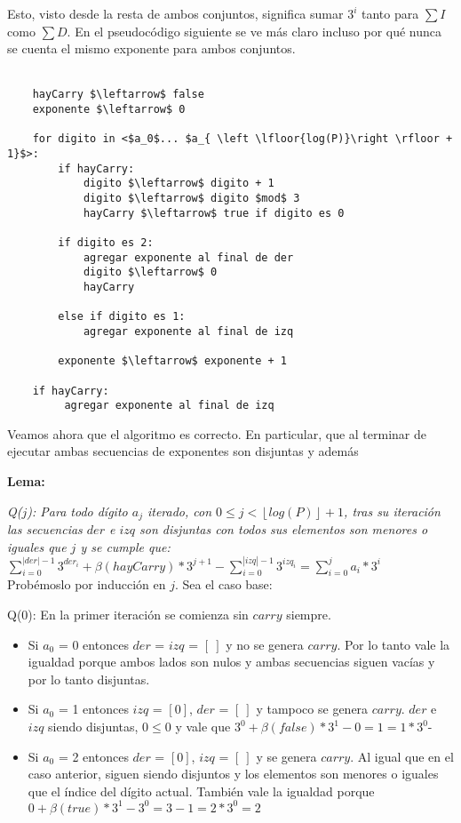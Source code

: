 	Esto, visto desde la resta de ambos conjuntos, significa sumar $3^{i}$ tanto para $\sum I$ como $\sum D$. En el pseudocódigo siguiente se ve más claro incluso por qué nunca se cuenta el mismo exponente para ambos conjuntos.
\\
\\
\begin{lstlisting}
    hayCarry $\leftarrow$ false
    exponente $\leftarrow$ 0

    for digito in <$a_0$... $a_{ \left \lfloor{log(P)}\right \rfloor + 1}$>:
        if hayCarry:
            digito $\leftarrow$ digito + 1
            digito $\leftarrow$ digito $mod$ 3
            hayCarry $\leftarrow$ true if digito es 0

        if digito es 2:
            agregar exponente al final de der
            digito $\leftarrow$ 0
            hayCarry

        else if digito es 1:
            agregar exponente al final de izq

        exponente $\leftarrow$ exponente + 1

    if hayCarry:
         agregar exponente al final de izq

\end{lstlisting}

	Veamos ahora que el algoritmo es correcto. En particular, que al terminar de ejecutar ambas secuencias de exponentes son disjuntas y además

	\begin{center}
		\textbf{Lema:}
	\end{center}

	\emph{
	Q($j$): Para todo dígito $a_j$ iterado, con $0 \leq j < \left \lfloor{log(P)}\right \rfloor + 1$, tras su iteración las secuencias $der$ e $izq$ son disjuntas con todos sus elementos son menores o iguales que $j$ y se cumple que:
	}
	\\

	$\sum_{i=0}^{|der|-1} 3^{der_i} + \beta(hayCarry)*3^{j+1} - \sum_{i=0}^{|izq|-1} 3^{izq_i} = \sum_{i=0}^{j} a_i*3^{i} $
	\\

	Probémoslo por inducción en $j$. Sea el caso base:

	Q($0$): En la primer iteración se comienza sin $carry$ siempre.

	\begin{itemize}
	\item Si $a_0$ = 0 entonces $der$ = $izq$ = $[\ ]$ y no se genera $carry$. Por lo tanto vale la igualdad porque ambos lados son nulos y ambas secuencias siguen vacías y por lo tanto disjuntas.
	\item Si $a_0$ = 1 entonces $izq$ = $[0]$, $der$ = $[\ ]$ y tampoco se genera $carry$. $der$ e $izq$ siendo disjuntas, $0 \leq 0$ y vale que $3^{0} + \beta(false)*3^{1} - 0 = 1 = 1*3^{0}$-
	\item Si $a_0$ = 2 entonces $der$ = $[0]$, $izq$ = $[\ ]$ y se genera $carry$. Al igual que en el caso anterior, siguen siendo disjuntos y los elementos son menores o iguales que el índice del dígito actual. También vale la igualdad porque $0 + \beta(true)*3^{1} - 3^{0} = 3 - 1 = 2*3^{0} = 2$
	\end{itemize}

